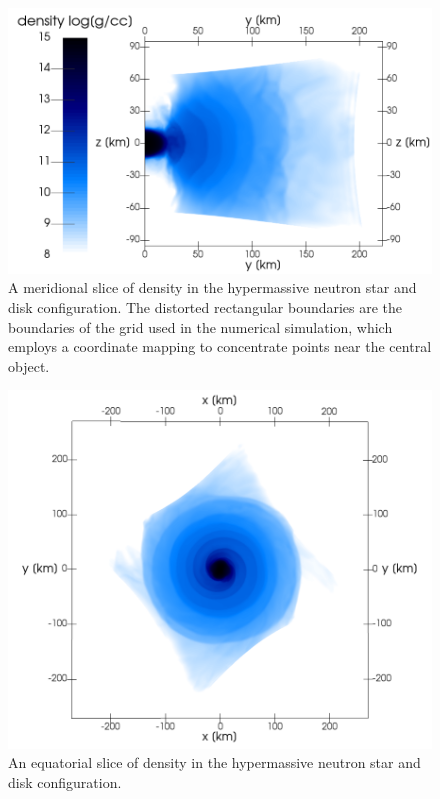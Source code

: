 \documentclass[aps,floatfix,prd,superscriptaddress,twocolumn]{revtex4-1}
\begin{document}
\begin{figure}
  \includegraphics[width=\columnwidth]{production-colormap-merid-rho}
  \caption{A meridional slice of density in the hypermassive neutron
    star and disk configuration.
    The distorted rectangular boundaries are the boundaries of the grid
    used in the numerical simulation, which employs a coordinate mapping to
    concentrate points near the central object.}
  \label{fig:nsns_rho_merid}
\end{figure}

\begin{figure}
  \includegraphics[width=\columnwidth]{production-colormap-equat-rho}
  \caption{An equatorial slice of density in the hypermassive neutron
    star and disk configuration.}
  \label{fig:nsns_rho_equat}
\end{figure}
\end{document}
